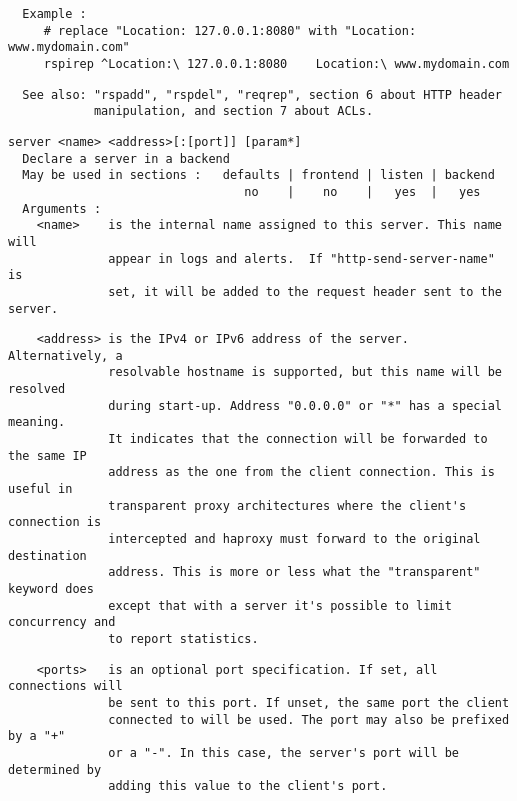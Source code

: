 \begin{verbatim}
  Example :
     # replace "Location: 127.0.0.1:8080" with "Location: www.mydomain.com"
     rspirep ^Location:\ 127.0.0.1:8080    Location:\ www.mydomain.com
\end{verbatim}

\begin{verbatim}
  See also: "rspadd", "rspdel", "reqrep", section 6 about HTTP header
            manipulation, and section 7 about ACLs.
\end{verbatim}

\begin{verbatim}
server <name> <address>[:[port]] [param*]
  Declare a server in a backend
  May be used in sections :   defaults | frontend | listen | backend
                                 no    |    no    |   yes  |   yes
  Arguments :
    <name>    is the internal name assigned to this server. This name will
              appear in logs and alerts.  If "http-send-server-name" is
              set, it will be added to the request header sent to the server.
\end{verbatim}

\begin{verbatim}
    <address> is the IPv4 or IPv6 address of the server. Alternatively, a
              resolvable hostname is supported, but this name will be resolved
              during start-up. Address "0.0.0.0" or "*" has a special meaning.
              It indicates that the connection will be forwarded to the same IP
              address as the one from the client connection. This is useful in
              transparent proxy architectures where the client's connection is
              intercepted and haproxy must forward to the original destination
              address. This is more or less what the "transparent" keyword does
              except that with a server it's possible to limit concurrency and
              to report statistics.
\end{verbatim}

\begin{verbatim}
    <ports>   is an optional port specification. If set, all connections will
              be sent to this port. If unset, the same port the client
              connected to will be used. The port may also be prefixed by a "+"
              or a "-". In this case, the server's port will be determined by
              adding this value to the client's port.
\end{verbatim}


